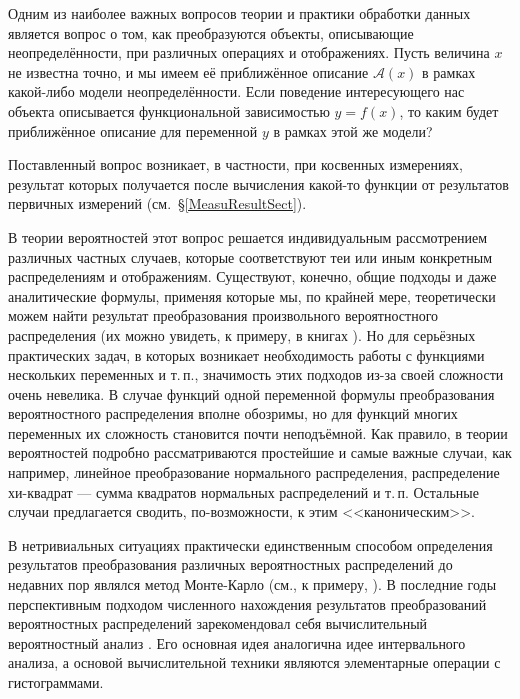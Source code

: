 \documentclass[a5paper,openany]{book}
\newcommand{\mcl}{\mathcal}
\begin{document}
Одним из наиболее важных вопросов теории и практики обработки данных является вопрос 
о том, как преобразуются объекты, описывающие неопределённости, при различных операциях 
и отображениях. Пусть величина $x$ не известна точно, и мы имеем её приближённое 
описание $\mcl{A}(x)$ в рамках какой-либо модели неопределённости. Если поведение  
интересующего нас объекта описывается функциональной зависимостью $y = f(x)$, то каким 
будет приближённое описание для переменной $y$ в рамках этой же модели? 
  
Поставленный вопрос возникает, в частности, при косвенных измерениях, %
результат которых получается после вычисления какой-то функции от результатов 
первичных измерений (см.~\S\ref{MeasuResultSect}). 
  
В теории вероятностей этот вопрос решается индивидуальным рассмотрением различных 
частных случаев, которые соответствуют теи или иным конкретным распределениям и 
отображениям. Существуют, конечно, общие подходы и даже аналитические формулы, 
применяя которые мы, по крайней мере, теоретически можем найти результат преобразования 
произвольного вероятностного распределения (их можно увидеть, к примеру, в книгах 
\cite{ESVentsel, Gnedenko}). Но для серьёзных практических задач, в которых возникает 
необходимость работы с функциями нескольких переменных и т.\,п., значимость этих подходов 
из-за своей сложности очень невелика. В случае функций одной переменной формулы 
преобразования вероятностного распределения вполне обозримы, но для функций многих 
переменных их сложность становится почти неподъёмной. Как правило, в теории вероятностей 
подробно рассматриваются простейшие и самые важные случаи, как например, линейное 
преобразование нормального распределения, распределение хи-квадрат --- сумма квадратов 
нормальных распределений и т.\,п. Остальные случаи предлагается сводить, по-возможности, 
к этим <<каноническим>>. 
  
В нетривиальных ситуациях практически единственным способом определения результатов 
преобразования различных вероятностных распределений до недавних пор являлся метод 
Монте-Карло (см., к примеру, \cite{Sobol}). В последние годы перспективным подходом 
численного нахождения результатов преобразований вероятностных распределений 
зарекомендовал себя вычислительный вероятностный анализ \cite{Dobronets}. Его 
основная идея аналогична идее интервального анализа, а основой вычислительной 
техники являются элементарные операции с гистограммами. 
  
\end{document}
